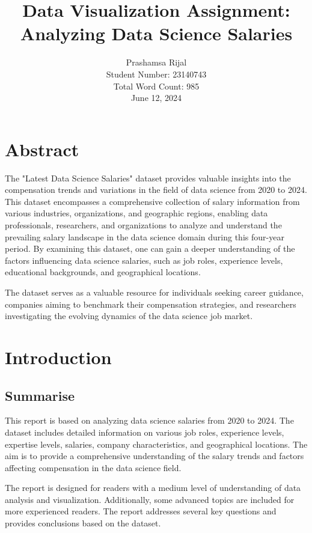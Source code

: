 \documentclass{article}\usepackage[]{graphicx}\usepackage[]{xcolor}
\title{Data Visualization Assignment: Analyzing Data Science Salaries}
\author{Prashamsa Rijal \\ Student Number: 23140743\\Total Word Count: 985 \\ June 12, 2024}
\begin{document}
\maketitle

\newpage
\tableofcontents
\newpage
\listoffigures

\newpage
\section*{Abstract}

The "Latest Data Science Salaries" dataset provides valuable insights into the compensation trends and variations in the field of data science from 2020 to 2024. This dataset encompasses a comprehensive collection of salary information from various industries, organizations, and geographic regions, enabling data professionals, researchers, and organizations to analyze and understand the prevailing salary landscape in the data science domain during this four-year period. By examining this dataset, one can gain a deeper understanding of the factors influencing data science salaries, such as job roles, experience levels, educational backgrounds, and geographical locations.

The dataset serves as a valuable resource for individuals seeking career guidance, companies aiming to benchmark their compensation strategies, and researchers investigating the evolving dynamics of the data science job market.

\newpage
\section{Introduction}
\subsection{Summarise}
This report is based on analyzing data science salaries from 2020 to 2024. The dataset includes detailed information on various job roles, experience levels, expertise levels, salaries, company characteristics, and geographical locations. The aim is to provide a comprehensive understanding of the salary trends and factors affecting compensation in the data science field.

The report is designed for readers with a medium level of understanding of data analysis and visualization. Additionally, some advanced topics are included for more experienced readers. The report addresses several key questions and provides conclusions based on the dataset.
\end{document}
